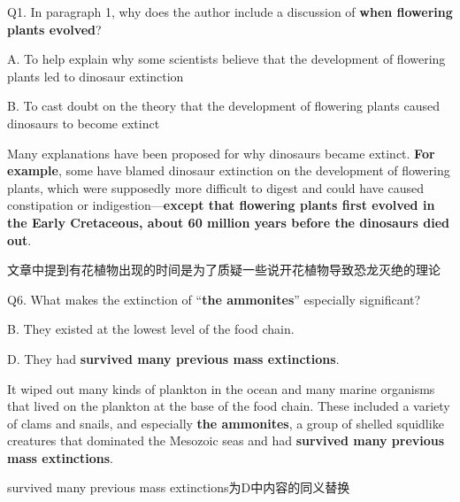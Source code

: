 \begin{blk}
    \begin{qst}
        Q1. In paragraph 1, why does the author include a discussion of \textbf{when flowering plants evolved}?
    \end{qst}

    \begin{chc}
        A. To help explain why some scientists believe that the development of flowering plants led to dinosaur extinction

        B. To cast doubt on the theory that the development of flowering plants caused dinosaurs to become extinct
    \end{chc}

    \begin{psgq}
        Many explanations have been proposed for why dinosaurs became extinct. \textbf{For example}, some have blamed dinosaur extinction on the development of flowering plants, which were supposedly more difficult to digest and could have caused constipation or indigestion—\textbf{except that flowering plants first evolved in the Early Cretaceous, about 60 million years before the dinosaurs died out}.
    \end{psgq}

    \begin{nlz}
        文章中提到有花植物出现的时间是为了质疑一些说开花植物导致恐龙灭绝的理论
    \end{nlz}
\end{blk}

\begin{blk}
    \begin{qst}
        Q6. What makes the extinction of “\textbf{the ammonites}” especially significant?
    \end{qst}

    \begin{chc}
        B. They existed at the lowest level of the food chain.

        D. They had \textbf{survived many previous mass extinctions}.
    \end{chc}

    \begin{psgq}
        It wiped out many kinds of plankton in the ocean and many marine organisms that lived on the plankton at the base of the food chain. These included a variety of clams and snails, and especially \textbf{the ammonites}, a group of shelled squidlike creatures that dominated the Mesozoic seas and had \textbf{survived many previous mass extinctions}.
    \end{psgq}

    \begin{nlz}
        survived many previous mass extinctions为D中内容的同义替换
    \end{nlz}
\end{blk}

